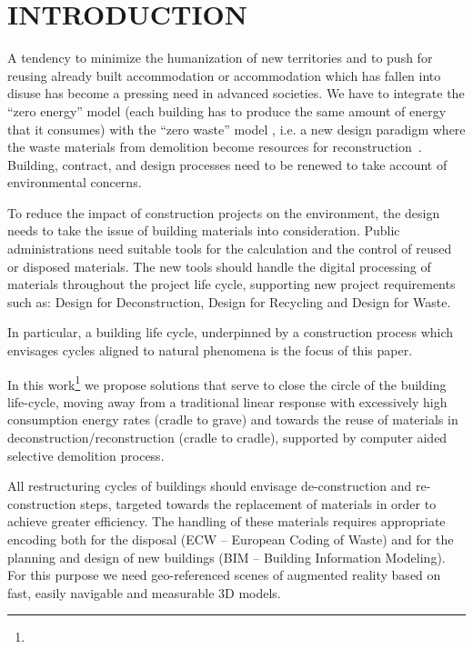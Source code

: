 \documentclass[a4paper,twoside]{article}
\begin{document}
%
\section{\uppercase{Introduction}}
\label{sec:introduction}

\noindent
A tendency to minimize the humanization of new territories and to push for reusing already  built accommodation or accommodation which has fallen into disuse has become a pressing need in advanced societies. We have to integrate the ``zero energy'' model (each building has to produce the same amount of energy that it consumes) with the ``zero waste'' model , i.e. a new design paradigm where the waste materials from demolition become resources for reconstruction~\cite{altamura:12}. Building, contract, and design processes need to be renewed to take account of environmental concerns. 

To reduce the impact of construction projects on the environment, the design needs to take the issue of building materials into consideration. Public administrations need suitable tools for the calculation and the control of reused or disposed materials. The new tools should handle the digital processing of materials throughout the project life cycle, supporting new project requirements such as: Design for Deconstruction, Design for Recycling and Design for Waste. 

In particular, a building life cycle, underpinned by a construction process which envisages cycles aligned to natural phenomena is the focus of this paper. 

In this work\footnote{\acks} we propose solutions that serve to close the circle of the building life-cycle, moving away from a traditional linear response with excessively high consumption energy rates (cradle to grave) and towards the reuse of materials in deconstruction/reconstruction (cradle to cradle), supported by computer aided selective demolition process.

All restructuring cycles of buildings should envisage de-construction and re-construction steps, targeted towards the replacement of materials in order to achieve greater efficiency. The handling of these materials requires appropriate encoding both for the disposal (ECW -- European Coding of Waste) and for the planning and design of new buildings (BIM -- Building Information Modeling). For this purpose we need geo-referenced scenes of augmented reality based on fast, easily navigable and measurable 3D models. 
\end{document}

